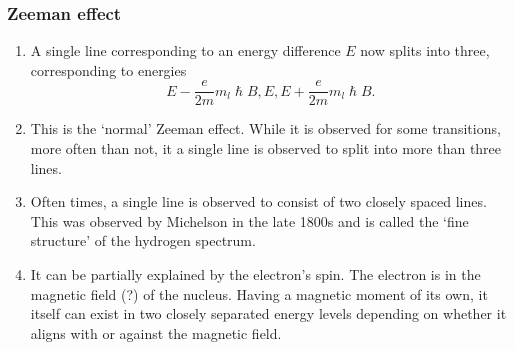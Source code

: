 \documentclass{beamer}
\begin{document}
\begin{frame}
\frametitle{Zeeman effect}
\begin{enumerate}
\item A single line corresponding to an energy difference $E$ now splits into 
three, corresponding to energies 
\[
E - \frac{e}{2m}m_l\hslash B, E, E + \frac{e}{2m}m_l\hslash B.
\]
\item This is the `normal' Zeeman effect. While it is observed for some 
transitions, more often than not, it a single line is observed to split into
more than three lines.
\item Often times, a single line is observed to consist of two closely spaced
lines. This was observed by Michelson in the late 1800s and is called the 
`fine structure' of the hydrogen spectrum.
\item It can be partially explained by the electron's spin. The electron is in
the magnetic field (?) of the nucleus. Having a magnetic moment of its own, it 
itself can exist in two closely separated energy levels depending on whether it
aligns with or against the magnetic field.
\end{enumerate}
\end{frame}
\end{document}

